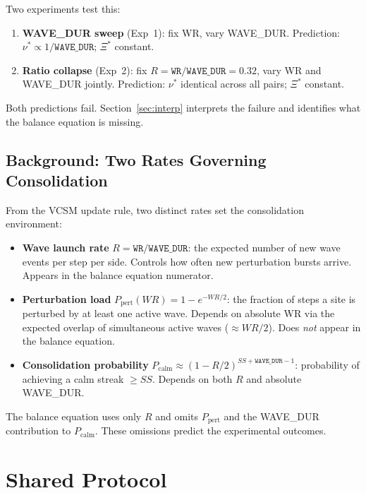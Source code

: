 \documentclass[11pt]{article}
\theoremstyle{remark}
\begin{document}
Two experiments test this:
\begin{enumerate}
  \item \textbf{WAVE\_DUR sweep} (Exp~1): fix WR, vary WAVE\_DUR. Prediction:
    $\nu^* \propto 1/\mathtt{WAVE\_DUR}$; $\Xi^*$ constant.
  \item \textbf{Ratio collapse} (Exp~2): fix $R = \mathtt{WR}/\mathtt{WAVE\_DUR} =
    0.32$, vary WR and WAVE\_DUR jointly. Prediction: $\nu^*$ identical across
    all pairs; $\Xi^*$ constant.
\end{enumerate}

Both predictions fail. Section~\ref{sec:interp} interprets the failure and
identifies what the balance equation is missing.

\subsection{Background: Two Rates Governing Consolidation}

From the VCSM update rule, two distinct rates set the consolidation environment:

\begin{itemize}
  \item \textbf{Wave launch rate} $R = \mathtt{WR}/\mathtt{WAVE\_DUR}$: the
    expected number of new wave events per step per side. Controls how often new
    perturbation bursts arrive. Appears in the balance equation numerator.
  \item \textbf{Perturbation load} $P_{\text{pert}}(WR) = 1 - e^{-WR/2}$: the
    fraction of steps a site is perturbed by at least one active wave. Depends on
    absolute WR via the expected overlap of simultaneous active waves ($\approx WR/2$).
    Does \emph{not} appear in the balance equation.
  \item \textbf{Consolidation probability} $P_{\text{calm}} \approx
    (1 - R/2)^{SS + \mathtt{WAVE\_DUR} - 1}$: probability of achieving a calm
    streak $\geq SS$. Depends on both $R$ and absolute WAVE\_DUR.
\end{itemize}

The balance equation uses only $R$ and omits $P_{\text{pert}}$ and the
WAVE\_DUR contribution to $P_{\text{calm}}$. These omissions predict the
experimental outcomes.

\section{Shared Protocol}
\end{document}
